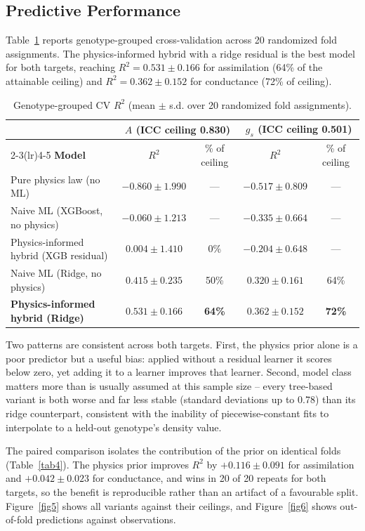 \documentclass[runningheads]{llncs}
\begin{document}
\subsection{Predictive Performance}\label{sec:perf}

Table~\ref{tab3} reports genotype-grouped cross-validation across 20 randomized fold assignments. The physics-informed hybrid with a ridge residual is the best model for both targets, reaching $R^{2}=0.531\pm0.166$ for assimilation (64\% of the attainable ceiling) and $R^{2}=0.362\pm0.152$ for conductance (72\% of ceiling).

\begin{table}
\caption{Genotype-grouped CV $R^{2}$ (mean $\pm$ s.d. over 20 randomized fold assignments).}\label{tab3}
\centering
\small
\begin{tabular}{lcccc}
\toprule
& \multicolumn{2}{c}{\textbf{$A$ (ICC ceiling 0.830)}} & \multicolumn{2}{c}{\textbf{$g_s$ (ICC ceiling 0.501)}} \\
\cmidrule(lr){2-3}\cmidrule(lr){4-5}
\textbf{Model} & $R^{2}$ & \% of ceiling & $R^{2}$ & \% of ceiling \\
\midrule
Pure physics law (no ML) & $-0.860\pm1.990$ & --- & $-0.517\pm0.809$ & --- \\
Naive ML (XGBoost, no physics) & $-0.060\pm1.213$ & --- & $-0.335\pm0.664$ & --- \\
Physics-informed hybrid (XGB residual) & $0.004\pm1.410$ & 0\% & $-0.204\pm0.648$ & --- \\
Naive ML (Ridge, no physics) & $0.415\pm0.235$ & 50\% & $0.320\pm0.161$ & 64\% \\
\textbf{Physics-informed hybrid (Ridge)} & $\mathbf{0.531\pm0.166}$ & \textbf{64\%} & $\mathbf{0.362\pm0.152}$ & \textbf{72\%} \\
\bottomrule
\end{tabular}
\end{table}

Two patterns are consistent across both targets. First, the physics prior alone is a poor predictor but a useful bias: applied without a residual learner it scores below zero, yet adding it to a learner improves that learner. Second, model class matters more than is usually assumed at this sample size -- every tree-based variant is both worse and far less stable (standard deviations up to 0.78) than its ridge counterpart, consistent with the inability of piecewise-constant fits to interpolate to a held-out genotype's density value.

The paired comparison isolates the contribution of the prior on identical folds (Table~\ref{tab4}). The physics prior improves $R^{2}$ by $+0.116\pm0.091$ for assimilation and $+0.042\pm0.023$ for conductance, and wins in 20 of 20 repeats for both targets, so the benefit is reproducible rather than an artifact of a favourable split. Figure~\ref{fig5} shows all variants against their ceilings, and Figure~\ref{fig6} shows out-of-fold predictions against observations.
\end{document}
